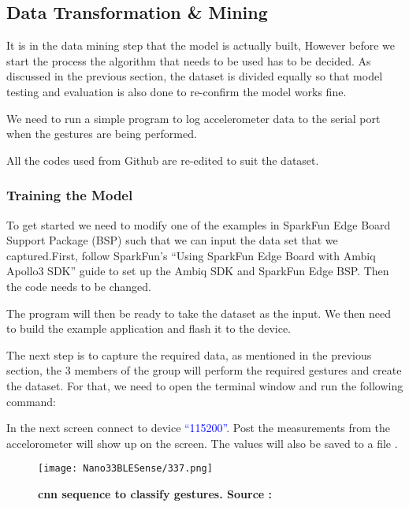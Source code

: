 \subsection{Data Transformation \& Mining}
It is in the data mining step that the model is actually built, However before we start the process the algorithm that needs to be used has to be decided. As discussed in the previous section, the dataset is divided equally so that model testing and evaluation is also done to re-confirm the model works fine.

We need to run a simple program to log accelerometer data to the serial port when the gestures are being performed. \cite{Warden:2020}


All the codes used from Github are re-edited to suit the dataset.

\subsubsection{Training the Model}

To get started we need to modify one of the examples in  SparkFun Edge Board Support Package (BSP) such that we can input the data set that we captured.First, follow SparkFun's ``Using SparkFun Edge Board with Ambiq Apollo3 SDK'' guide to set up the Ambiq SDK and SparkFun Edge BSP. Then the code needs to be changed.\cite{Warden:2020}

The program will then be ready to take the dataset as the input. We then need to build the example application and flash it to the device.

The next step is to capture the required data, as mentioned in the previous section, the 3 members of the group will perform the required gestures and create the dataset. For that, we need to open the terminal window and run the following command:

\medskip


\medskip

In the next screen connect to device \textcolor{blue}{``115200''}. Post the measurements from the accelorometer will show up on the screen. The values will also be saved to a file . \cite{Warden:2020}

\begin{figure}
    \texttt{[image: Nano33BLESense/337.png]}
    \caption{\textbf{\ac{cnn} sequence to classify gestures. Source : \cite{Warden:2020}}}
    \label{fig:T1}
\end{figure}

